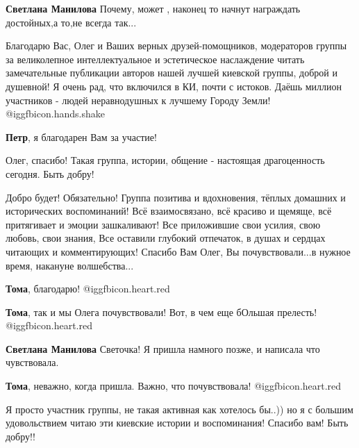 \begin{itemize}
\begin{itemize}
\textbf{Светлана Манилова} Почему, может , наконец то начнут награждать достойных,а то,не всегда так...
\end{itemize} %


Благодарю Вас, Олег и Ваших верных друзей-помощников, модераторов группы за
великолепное интеллектуальное и эстетическое наслаждение читать замечательные
публикации авторов нашей лучшей киевской группы, доброй и душевной! Я очень
рад, что включился в КИ, почти с истоков. Даёшь миллион участников - людей
неравнодушных к лучшему Городу Земли! @igg{fbicon.hands.shake} 

\begin{itemize} %
\textbf{Петр}, я благодарен Вам за участие!
\end{itemize} %

Олег, спасибо! Такая группа, истории, общение - настоящая драгоценность сегодня. Быть добру!


Добро будет! Обязательно! Группа позитива и вдохновения, тёплых домашних и
исторических воспоминаний! Всё взаимосвязано, всё красиво и щемяще, всё
притягивает и эмоции зашкаливают! Все приложившие свои усилия, свою любовь,
свои знания, Все оставили глубокий отпечаток, в душах и сердцах читающих и
комментирующих! Спасибо Вам Олег, Вы почувствовали...в нужное время, накануне
волшебства...

\begin{itemize} %
\textbf{Тома}, благодарю! @igg{fbicon.heart.red}

\textbf{Тома}, так и мы Олега почувствовали! Вот, в чем еще бОльшая прелесть! @igg{fbicon.heart.red}

\begin{itemize} %
\textbf{Светлана Манилова} Светочка! Я пришла намного позже, и написала что чувствовала.

\textbf{Тома}, неважно, когда пришла. Важно, что почувствовала! @igg{fbicon.heart.red}
\end{itemize} %

\end{itemize} %


Я просто участник группы, не такая активная как хотелось бы..)) но я с большим
удовольствием читаю эти киевские истории и воспоминания! Спасибо вам! Быть
добру!!


\end{itemize}
